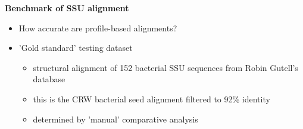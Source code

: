 \documentclass[landscape]{slides}
\begin{document}
\begin{slide}


\vfill

\end{slide}
\begin{slide}
\begin{center}
\textbf{Benchmark of SSU alignment}
\end{center}
\medskip

\small
\begin{itemize}
\item
How accurate are profile-based alignments?
\item
'Gold standard' testing dataset
\begin{itemize}
\item
structural alignment of 152 bacterial SSU sequences
from Robin Gutell's database
\item
this is the CRW bacterial seed alignment filtered to 92\% identity
\item
determined by 'manual' comparative analysis
\end{itemize}
\end{itemize}


\vfill
\end{slide}
\end{document}
